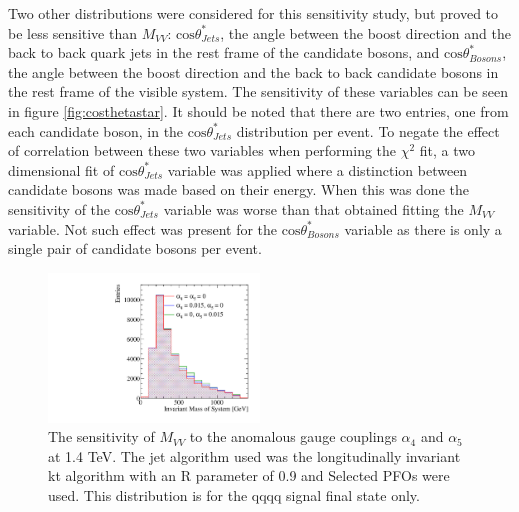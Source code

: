 Two other distributions were considered for this sensitivity study, but proved to be less sensitive than $M_{VV}$: $\text{cos}\theta^{*}_{Jets}$, the angle between the boost direction and the back to back quark jets in the rest frame of the candidate bosons, and $\text{cos}\theta^{*}_{Bosons}$, the angle between the boost direction and the back to back candidate bosons in the rest frame of the visible system.  The sensitivity of these variables can be seen in figure \ref{fig:costhetastar}.  It should be noted that there are two entries, one from each candidate boson, in the $\text{cos}\theta^{*}_{Jets}$ distribution per event.  To negate the effect of correlation between these two variables when performing the $\chi^{2}$ fit, a two dimensional fit of $\text{cos}\theta^{*}_{Jets}$ variable was applied where a distinction between candidate bosons was made based on their energy.  When this was done the sensitivity of the $\text{cos}\theta^{*}_{Jets}$ variable was worse than that obtained fitting the $M_{VV}$ variable.  Not such effect was present for the $\text{cos}\theta^{*}_{Bosons}$ variable as there is only a single pair of candidate bosons per event.

\begin{figure}[h!]
\centering
\includegraphics[width=0.5\textwidth]{PhysicsAnalysis/Plots/SensitiveDistributions/MVVs_SPFOs_kt_0p90_1400GeV.pdf}
\caption[The sensitivity of $M_{VV}$ to the anomalous gauge couplings $\alpha_{4}$ and $\alpha_{5}$ at 1.4 TeV.  The jet algorithm used was the longitudinally invariant kt algorithm with an R parameter of 0.9 and Selected PFOs were used.  This distribution is for the \nu{\nu}qqqq signal final state only.]{The sensitivity of $M_{VV}$ to the anomalous gauge couplings $\alpha_{4}$ and $\alpha_{5}$ at 1.4 TeV.  The jet algorithm used was the longitudinally invariant kt algorithm with an R parameter of 0.9 and Selected PFOs were used.  This distribution is for the \nu{\nu}qqqq signal final state only.}
\label{fig:mvv}
\end{figure}

